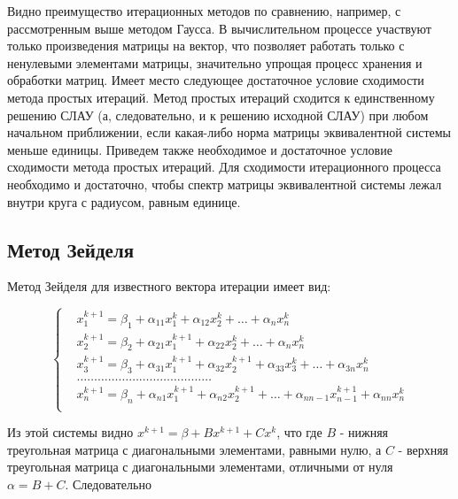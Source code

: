 Видно преимущество итерационных методов по сравнению, например, с рассмотренным
выше методом Гаусса. В вычислительном процессе участвуют только произведения матрицы на
вектор, что позволяет работать только с ненулевыми элементами матрицы, значительно
упрощая процесс хранения и обработки матриц.
Имеет место следующее достаточное условие сходимости метода простых итераций.
Метод простых итераций сходится к единственному решению СЛАУ (а,
следовательно, и к решению исходной СЛАУ) при любом начальном приближении, если
какая-либо норма матрицы эквивалентной системы меньше единицы.
Приведем также необходимое и достаточное условие сходимости метода простых итераций.
Для сходимости итерационного процесса необходимо и достаточно, чтобы спектр
матрицы  эквивалентной системы лежал внутри круга с радиусом, равным единице.

\pagebreak

\subsection*{Метод Зейделя}

Метод Зейделя для известного вектора итерации имеет вид:

$$\left\{\begin{aligned}
    &x^{k+1}_{1}=\beta_1 + \alpha_{11}x^{k}_1 + \alpha_{12}x^{k}_2+ \hdots + \alpha_{n}x^{k}_n \\
    &x^{k+1}_{2}=\beta_2 + \alpha_{21}x^{k+1}_1 + \alpha_{22}x^{k}_2+ \hdots + \alpha_{n}x^{k}_n \\
    &x^{k+1}_{3}=\beta_3 + \alpha_{31}x^{k+1}_1 + \alpha_{32}x^{k+1}_2+ \alpha_{33}x^k_3 + \hdots + \alpha_{3n}x^{k}_n \\
    &\dots\dots\dots\dots\dots\dots\dots\dots\dots\dots\dots\dots\dots\\
    &x^{k+1}_{n}=\beta_n + \alpha_{n1}x^{k+1}_1 + \alpha_{n2}x^{k+1}_2 + \hdots + \alpha_{nn-1}x^{k+1}_{n-1} + \alpha_{nn}x^{k}_n \\
\end{aligned}\right.$$

Из этой системы видно $x^{k+1} = \beta + Bx^{k+1} + Cx^k$, что где $B$ - нижняя треугольная матрица с
диагональными элементами, равными нулю, а $C$ - верхняя треугольная
матрица с диагональными элементами, отличными от нуля $\alpha = B + C$. Следовательно
\pagebreak